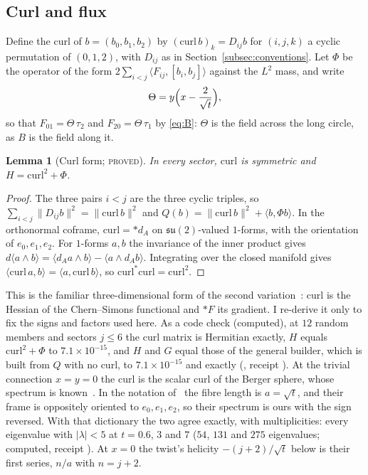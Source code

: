 \documentclass[11pt]{article}
\newtheorem{lemma}[theorem]{Lemma}
\theoremstyle{definition}
\theoremstyle{remark}
\newcommand{\su}{\mathfrak{su}(2)}
\newcommand{\norm}[1]{\lVert #1\rVert}
\newcommand{\PROVED}{\textsc{proved}}
\begin{document}
\subsection{Curl and flux}\label{subsec:curlflux}

Define the curl of $b=(b_0,b_1,b_2)$ by $(\mathrm{curl}\,b)_k=D_{ij}b$ for $(i,j,k)$ a cyclic permutation of
$(0,1,2)$, with $D_{ij}$ as in Section~\ref{subsec:conventions}. Let $\Phi$ be the operator of the form
$2\sum_{i<j}\langle F_{ij},[b_i,b_j]\rangle$ against the $L^2$ mass, and write
\begin{equation}\label{eq:theta}
  \Theta=y\Bigl(x-\frac2{\sqrt t}\Bigr),
\end{equation}
so that $F_{01}=\Theta\,\tau_2$ and $F_{20}=\Theta\,\tau_1$ by \eqref{eq:B}: $\Theta$ is the field across the long circle,
as $B$ is the field along it.

\begin{lemma}[Curl form; \PROVED]\label{lem:curlform}
In every sector, $\mathrm{curl}$ is symmetric and $H=\mathrm{curl}^2+\Phi$.
\end{lemma}
\begin{proof}
The three pairs $i<j$ are the three cyclic triples, so $\sum_{i<j}\norm{D_{ij}b}^2=\norm{\mathrm{curl}\,b}^2$ and
$Q(b)=\norm{\mathrm{curl}\,b}^2+\langle b,\Phi b\rangle$. In the orthonormal coframe, $\mathrm{curl}=\ast d_A$ on
$\su$-valued $1$-forms, with the orientation of $e_0,e_1,e_2$. For $1$-forms $a,b$ the invariance of the inner product
gives $d\langle a\wedge b\rangle=\langle d_Aa\wedge b\rangle-\langle a\wedge d_Ab\rangle$. Integrating over the closed
manifold gives $\langle\mathrm{curl}\,a,b\rangle=\langle a,\mathrm{curl}\,b\rangle$, so $\mathrm{curl}^*\mathrm{curl}=\mathrm{curl}^2$.
\end{proof}

This is the familiar three-dimensional form of the second variation~\cite{bl1981}: $\mathrm{curl}$ is the Hessian of
the Chern--Simons functional and $\ast F$ its gradient. I re-derive it only to fix the signs and factors used here. As a
code check (computed), at $12$ random members and sectors $j\le6$ the curl matrix is Hermitian exactly, $H$ equals
$\mathrm{curl}^2+\Phi$ to $7.1\times10^{-15}$, and $H$ and $G$ equal those of the general builder, which is built from
$Q$ with no curl, to $7.1\times10^{-15}$ and exactly (, receipt
). At the trivial connection $x=y=0$ the curl is the scalar curl of
the Berger sphere, whose spectrum is known~\cite{gibbons1980,capoferrivassiliev2026}. In the notation
of~\cite[Theorem~D.1]{capoferrivassiliev2026} the fibre length is $a=\sqrt t$, and their frame is oppositely oriented to
$e_0,e_1,e_2$, so their spectrum is ours with the sign reversed. With that dictionary the two agree exactly, with
multiplicities: every eigenvalue with $|\lambda|<5$ at $t=0.6$, $3$ and $7$ ($54$, $131$ and $275$ eigenvalues;
computed, receipt ). At $x=0$ the twist's helicity $-(j+2)/\sqrt t$ below is their first series,
$n/a$ with $n=j+2$.
\end{document}
